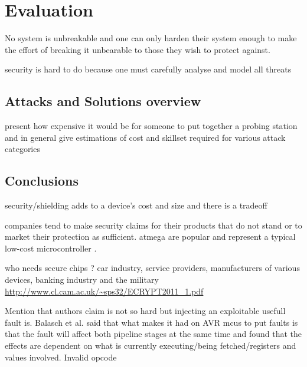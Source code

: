 \section{Evaluation}
\label{sec:conclusion}

No system is unbreakable and one can only harden their system enough to make the effort of breaking it unbearable to those they wish to protect against\citep{anderson:cautionary_note}\cite{sergei:thesis}.

security is hard to do because one must carefully analyse and model all threats \citep{kocher:DPA}
	\subsection{Attacks and Solutions overview}
	present how expensive it would be for someone to put together a probing station and in general give estimations of cost  and skillset required for various attack categories
	\subsection{Conclusions}

security/shielding adds to a device's cost and size \citep{kocher:DPA} and there is a tradeoff \citep{sergei:thesis}


companies tend to make security claims for their products that do not stand or to market their protection as sufficient\citep{sergei:thesis}. atmega are popular and represent a typical low-cost microcontroller \citep{glitches_paper}. 

who needs secure chips ? car industry, service providers, manufacturers of various devices, banking industry and the military \url{http://www.cl.cam.ac.uk/~sps32/ECRYPT2011_1.pdf}

Mention that authors claim is not so hard \citep{sergei:thesis} but injecting an exploitable usefull fault is. Balasch et al. \citep{glitches_paper} said that what makes it had on AVR mcus to put faults is that the fault will affect both pipeline stages at the same time and found that the effects are dependent on what is currently executing/being fetched/registers and values involved. Invalid opcode


